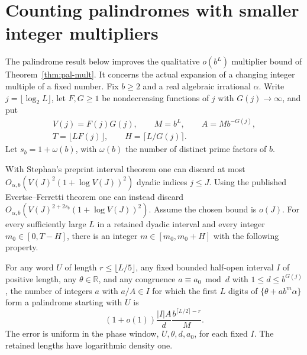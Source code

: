 \section{Counting palindromes with smaller integer multipliers}
\label{sec:palindrome-counts}

The palindrome result below improves the qualitative \(o(b^L)\) multiplier bound of Theorem~\ref{thm:pal-mult}. It concerns the actual expansion of a changing integer multiple of a fixed number. Fix \(b\ge2\) and a real algebraic irrational \(\alpha\). Write \(j=\lfloor\log_2 L\rfloor\), let \(F,G\ge1\) be nondecreasing functions of \(j\) with \(G(j)\to\infty\), and put
\[
 \begin{gathered}
 V(j)=F(j)G(j),\qquad M=b^L,\qquad A=M b^{-G(j)},\\
 T=\lfloor LF(j)\rfloor,\qquad H=\lceil L/G(j)\rceil .
 \end{gathered}
\]
Let \(s_b=1+\omega(b)\), with \(\omega(b)\) the number of distinct prime factors of \(b\).

\begin{theorem}\label{thm:palindrome-counts}
With Stephan's preprint interval theorem one can discard at most
\(O_{\alpha,b}(V(J)^2(1+\log V(J))^2)\) dyadic indices \(j\le J\).
Using the published Evertse--Ferretti theorem one can instead discard
\(O_{\alpha,b}(V(J)^{2+2s_b}(1+\log V(J))^2)\).
Assume the chosen bound is \(o(J)\). For every sufficiently large \(L\) in a retained dyadic interval and every integer \(m_0\in[0,T-H]\), there is an integer \(m\in[m_0,m_0+H]\) with the following property.

For any word \(U\) of length \(r\le\lfloor L/5\rfloor\), any fixed bounded half-open interval \(I\) of positive length, any \(\theta\in\mathbb R\), and any congruence \(a\equiv a_0\bmod d\) with \(1\le d\le b^{G(j)}\), the number of integers \(a\) with \(a/A\in I\) for which the first \(L\) digits of \(\{\theta+a b^m\alpha\}\) form a palindrome starting with \(U\) is
\begin{equation}\label{eq:palindrome-count-main}
       (1+o(1))\frac{|I|A}{d}\frac{b^{\lceil L/2\rceil-r}}{M}.
\end{equation}
The error is uniform in the phase window, \(U,\theta,d,a_0\), for each fixed \(I\). The retained lengths have logarithmic density one.
\end{theorem}

